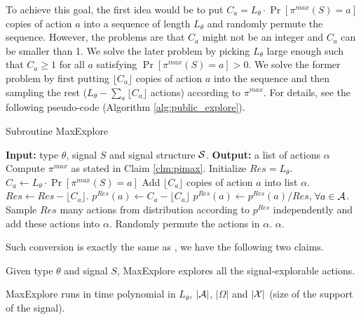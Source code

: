 To achieve this goal, the first idea would be to put $C_a = L_{\theta} \cdot \Pr[\pi^{max}(S) = a]$ copies of action $a$ into a sequence of length $L_{\theta}$ and randomly permute the sequence. However, the problems are that $C_a$ might not be an integer and $C_a$ can be smaller than 1. We solve the later problem by picking $L_{\theta}$ large enough such that $C_a \geq 1$ for all $a$ satisfying $\Pr[\pi^{max}(S) =a] > 0$. We solve the former problem by first putting $\lfloor C_a \rfloor$ copies of action $a$ into the sequence and then sampling the rest ($L_\theta - \sum_a \lfloor C_a \rfloor$ actions) according to $\pi^{max}$. For details, see the following pseudo-code (Algorithm \ref{alg:public_explore}). 
 \begin{algorithm}[H]
    \caption{Subroutine MaxExplore}
    	\label{alg:public_explore}
    \begin{algorithmic}[1]
	\STATE \textbf{Input:} type $\theta$, signal $S$ and signal structure $\S$.
	\STATE \textbf{Output:} a list of actions $\alpha$
	\STATE Compute $\pi^{max}$ as stated in Claim \ref{clm:pimax}.
		\STATE Initialize $Res = L_{\theta}$.
							\STATE $C_a \leftarrow  L_{\theta} \cdot \Pr[\pi^{max}(S) = a]$
                     		\STATE Add $\lfloor C_a \rfloor$ copies of action $a$ into list $\alpha$.
			\STATE $Res \leftarrow Res -\lfloor C_a \rfloor $.
			\STATE $p^{Res}(a)\leftarrow  C_a -  \lfloor C_a\rfloor$
		\ENDFOR
		\STATE $p^{Res}(a) \leftarrow p^{Res}(a) / Res$, $\forall a \in \A$.
		\STATE Sample $Res$ many actions from distribution according to $p^{Res}$ independently and add these actions into $\alpha$.
		\STATE Randomly permute the actions in $\alpha$.
	\RETURN $\alpha$.	
     \end{algorithmic}
\end{algorithm}

Such conversion is exactly the same as \cite{ICexplorationGames-ec16-working}, we have the following two claims.

\begin{claim}
\label{clm:maxexplore}
Given type $\theta$ and signal $S$, MaxExplore explores all the signal-explorable actions.
\end{claim}

\begin{claim}
MaxExplore runs in time polynomial in $L_{\theta}$, $|\A|$, $|\varOmega|$ and $|\X|$ (size of the support of the signal). 
\end{claim}

